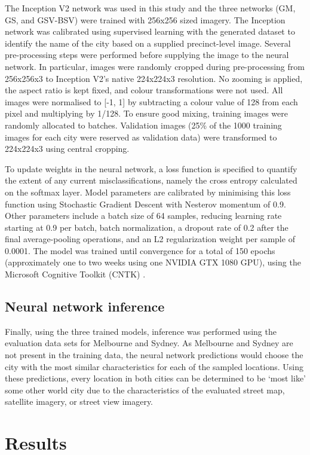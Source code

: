 \documentclass[10pt,letterpaper,hidelinks]{article}
\begin{document}
The Inception V2 network was used in this study and the three networks (GM, GS, and GSV-BSV) were trained with 256x256 sized imagery. The Inception network was calibrated using supervised learning with the generated dataset to identify the name of the city based on a supplied precinct-level image. Several pre-processing steps were performed before supplying the image to the neural network. In particular, images were randomly cropped during pre-processing from 256x256x3 to Inception V2's native 224x224x3 resolution. No zooming is applied, the aspect ratio is kept fixed, and colour transformations were not used. All images were normalised to [-1, 1] by subtracting a colour value of 128 from each pixel and multiplying by 1/128. To ensure good mixing, training images were randomly allocated to batches. Validation images (25\% of the 1000 training images for each city were reserved as validation data) were transformed to 224x224x3 using central cropping.


To update weights in the neural network, a loss function is specified to quantify the extent of any current misclassifications, namely the cross entropy calculated on the softmax layer. Model parameters are calibrated by minimising this loss function using Stochastic Gradient Descent with Nesterov momentum of 0.9. Other parameters include a batch size of 64 samples, reducing learning rate starting at 0.9 per batch, batch normalization, a dropout rate of 0.2 after the final average-pooling operations, and an L2 regularization weight per sample of 0.0001. 
The model was trained until convergence for a total of 150 epochs (approximately one to two weeks using one NVIDIA GTX 1080 GPU), using the Microsoft Cognitive Toolkit (CNTK) \cite{Yu2015}. 


\subsection*{Neural network inference}\label{sec:methods5}    
Finally, using the three trained models, inference was performed using the evaluation data sets for Melbourne and Sydney. As Melbourne and Sydney are not present in the training data, the neural network predictions would choose the city with the most similar characteristics for each of the sampled locations. Using these predictions, every location in both cities can be determined to be `most like' some other world city due to the characteristics of the evaluated street map, satellite imagery, or street view imagery.

\section*{Results}\label{sec:results}
\end{document}
